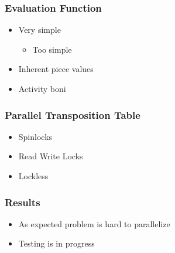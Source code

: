 \documentclass{beamer}
\begin{document}
\begin{frame}
\frametitle{Evaluation Function}
\begin{itemize}
\item Very simple
\begin{itemize}
\item Too simple
\end{itemize}
\item Inherent piece values
\item Activity boni
\end{itemize}
\end{frame}

\begin{frame}
\frametitle{Parallel Transposition Table}
\begin{itemize}
\item Spinlocks
\item Read Write Locks
\item Lockless
\end{itemize}
\end{frame}

\begin{frame}
\frametitle{Results}
\begin{itemize}
\item As expected problem is hard to parallelize
\item Testing is in progress
\end{itemize}
\end{frame}

\end{document}
